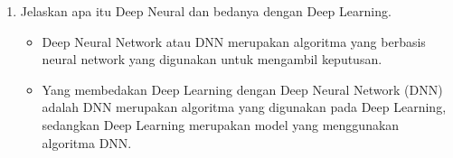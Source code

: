 \begin{enumerate}
\item Jelaskan apa itu Deep Neural dan bedanya dengan Deep Learning.
\begin{itemize}
\item Deep Neural Network atau DNN merupakan algoritma yang berbasis neural network yang digunakan untuk mengambil keputusan.
\item Yang membedakan Deep Learning dengan  Deep Neural Network (DNN) adalah DNN merupakan algoritma yang digunakan pada Deep Learning, sedangkan Deep Learning merupakan model yang menggunakan algoritma DNN.
\end{itemize}
\end{enumerate}
